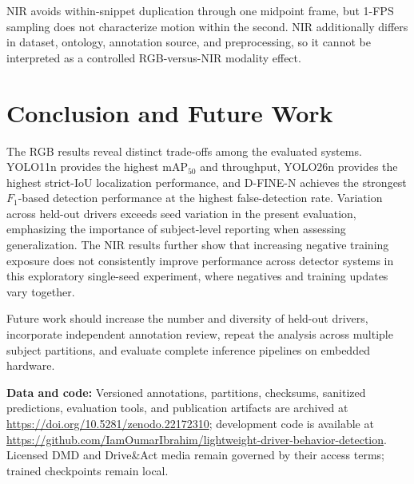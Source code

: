 \documentclass[conference]{IEEEtran}
\newcommand{\rev}[1]{{\color{blue}#1}}
\begin{document}
NIR avoids within-snippet duplication through one midpoint frame, but 1-FPS sampling does not characterize motion within the second. NIR additionally differs in dataset, ontology, annotation source, and preprocessing, so it cannot be interpreted as a controlled RGB-versus-NIR modality effect.

\section{Conclusion and Future Work}
The RGB results reveal distinct trade-offs among the evaluated systems. YOLO11n provides the highest mAP$_{50}$ and throughput, YOLO26n provides the highest strict-IoU localization performance, and D-FINE-N achieves the strongest $F_1$-based detection performance \rev{at the highest false-detection rate}. Variation across held-out drivers exceeds seed variation in the present evaluation, emphasizing the importance of subject-level reporting when assessing generalization. The NIR results further show that increasing negative training exposure does not consistently improve performance across detector systems \rev{in this exploratory single-seed experiment, where negatives and training updates vary together}.

Future work should increase the number and diversity of held-out drivers, incorporate independent annotation review, repeat the analysis across multiple subject partitions, and evaluate complete inference pipelines on embedded hardware.

\noindent\textbf{Data and code:} Versioned annotations, partitions, checksums, sanitized predictions, evaluation tools, and publication artifacts are archived at \url{https://doi.org/10.5281/zenodo.22172310}; development code is available at \url{https://github.com/IamOumarIbrahim/lightweight-driver-behavior-detection}. Licensed DMD and Drive\&Act media remain governed by their access terms; trained checkpoints remain local.

\enlargethispage{2\baselineskip}
\FloatBarrier



\clearpage
\end{document}
